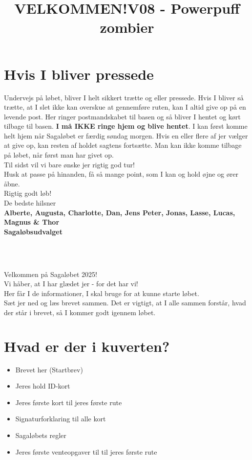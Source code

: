 \section{Hvis I bliver pressede}
Undervejs på løbet, bliver I helt sikkert trætte og eller pressede. Hvis I bliver så trætte, at I slet ikke kan overskue at gennemføre ruten, kan I altid give op på en levende post. Her ringer postmandskabet til basen og så bliver I hentet og kørt tilbage til basen. \textbf{I må IKKE ringe hjem og blive hentet}. I kan først komme helt hjem når Sagaløbet er færdig søndag morgen. Hvis en eller flere af jer vælger at give op, kan resten af holdet sagtens fortsætte. Man kan ikke komme tilbage på løbet, når først man har givet op.\\
\newline
Til sidst vil vi bare ønske jer rigtig god tur!\\
Husk at passe på hinanden, få så mange point, som I kan og hold øjne og ører åbne.\\
\newline
Rigtig godt løb!\\
\newline
\textcolor{søblå}{De bedste hilsner}\\
\textcolor{natblå}{\textbf{Alberte, Augusta, Charlotte, Dan, Jens Peter, Jonas, Lasse, Lucas, Magnus \& Thor}}\\
\textcolor{natblå}{\textbf{Sagaløbsudvalget}}\\
\newpage
\title{VELKOMMEN!}\\
\newline
\title{\textcolor{søblå}{V08 - Powerpuff zombier }}\\
\newline
Velkommen på Sagaløbet 2025!\\
Vi håber, at I har glædet jer - for det har vi!\\
Her får I de informationer, I skal bruge for at kunne starte løbet.\\
Sæt jer ned og læs brevet sammen. Det er vigtigt, at I alle sammen forstår, hvad der står i brevet, så I kommer godt igennem løbet.
\section{Hvad er der i kuverten?}
\begin{itemize}
    \item Brevet her (Startbrev)
    \item Jeres hold ID-kort
    \item Jeres første kort til jeres første rute
    \item Signaturforklaring til alle kort
    \item Sagaløbets regler
    \item Jeres første venteopgaver til til jeres første rute
\end{itemize}
